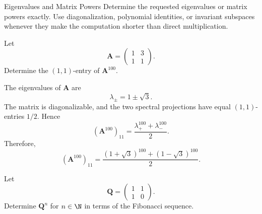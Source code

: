    \begin{expectedproblemgroup}{Eigenvalues and Matrix Powers}
        Determine the requested eigenvalues or matrix powers exactly. Use
        diagonalization, polynomial identities, or invariant subspaces whenever
        they make the computation shorter than direct multiplication.

        \begin{expectedsubproblem}[1997 VTRMC]
            Let
            \[
                \mathbf{A}
                =
                \begin{pmatrix}
                    1 & 3\\
                    1 & 1
                \end{pmatrix}.
            \]
            Determine the $(1,1)$-entry of $\mathbf{A}^{100}$.
        \end{expectedsubproblem}

        \begin{expectedsubsolution}
            The eigenvalues of $\mathbf{A}$ are
            \[
                \lambda_\pm=1\pm\sqrt3.
            \]
            The matrix is diagonalizable, and the two spectral projections have
            equal $(1,1)$-entries $1/2$. Hence
            \[
                (\mathbf{A}^{100})_{11}
                =
                \frac{\lambda_+^{100}+\lambda_-^{100}}{2}.
            \]
            Therefore,
            \[
                \boxed{
                    (\mathbf{A}^{100})_{11}
                    =
                    \frac{(1+\sqrt3)^{100}+(1-\sqrt3)^{100}}{2}
                }.
            \]
        \end{expectedsubsolution}

        \begin{expectedsubproblem}
            Let
            \[
                \mathbf{Q}
                =
                \begin{pmatrix}
                    1 & 1\\
                    1 & 0
                \end{pmatrix}.
            \]
            Determine $\mathbf{Q}^n$ for $n\in\N$ in terms of the Fibonacci
            sequence.
        \end{expectedsubproblem}


\end{expectedproblemgroup}
